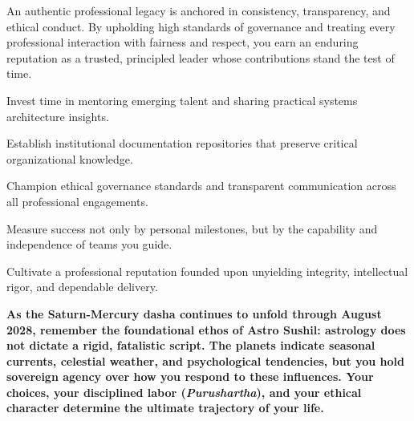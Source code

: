 {\fontsize{9}{13}\selectfont An authentic professional legacy is anchored in consistency, transparency, and ethical conduct. By upholding high standards of governance and treating every professional interaction with fairness and respect, you earn an enduring reputation as a trusted, principled leader whose contributions stand the test of time.}\par\vspace{1.8mm}

\begin{diamondlist}
  \item {\fontsize{8.5}{12}\selectfont Invest time in mentoring emerging talent and sharing practical systems architecture insights.}
  \item {\fontsize{8.5}{12}\selectfont Establish institutional documentation repositories that preserve critical organizational knowledge.}
  \item {\fontsize{8.5}{12}\selectfont Champion ethical governance standards and transparent communication across all professional engagements.}
  \item {\fontsize{8.5}{12}\selectfont Measure success not only by personal milestones, but by the capability and independence of teams you guide.}
  \item {\fontsize{8.5}{12}\selectfont Cultivate a professional reputation founded upon unyielding integrity, intellectual rigor, and dependable delivery.}
\end{diamondlist}


\label{topic72}

{\fontsize{9.5}{13.8}\selectfont\bfseries\color{DeepSlate} As the Saturn-Mercury dasha continues to unfold through August 2028, remember the foundational ethos of Astro Sushil: astrology does not dictate a rigid, fatalistic script. The planets indicate seasonal currents, celestial weather, and psychological tendencies, but you hold sovereign agency over how you respond to these influences. Your choices, your disciplined labor (\textit{Purushartha}), and your ethical character determine the ultimate trajectory of your life.}\par\vspace{2mm}

